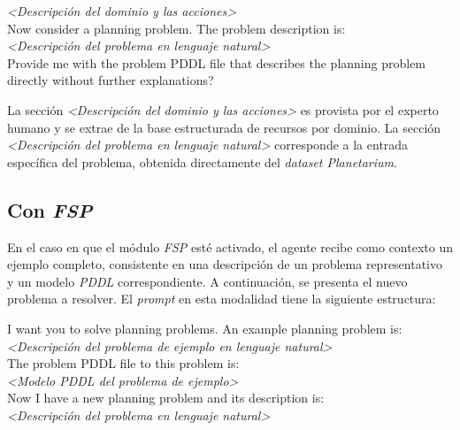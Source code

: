 \begin{anexes}
\begin{tcolorbox}[colback=gray!10!white, colframe=black, title=\textit{Prompt} del agente modelador sin \textit{FSP}, fonttitle=\bfseries, breakable]
\textit{<Descripción del dominio y las acciones>} \\

Now consider a planning problem. The problem description is: \\
\textit{<Descripción del problema en lenguaje natural>} \\

Provide me with the problem PDDL file that describes the planning problem directly without further explanations?
\end{tcolorbox}

La sección \textit{<Descripción del dominio y las acciones>} es provista por el experto humano y se extrae de la base estructurada de recursos por dominio. La sección \textit{<Descripción del problema en lenguaje natural>} corresponde a la entrada específica del problema, obtenida directamente del \textit{dataset Planetarium}.

\subsection*{Con \textit{FSP}}

En el caso en que el módulo \textit{FSP} esté activado, el agente recibe como contexto un ejemplo completo, consistente en una descripción de un problema representativo y un modelo \textit{PDDL} correspondiente. A continuación, se presenta el nuevo problema a resolver. El \textit{prompt} en esta modalidad tiene la siguiente estructura:

\begin{tcolorbox}[colback=gray!10!white, colframe=black, title=\textit{Prompt} del agente modelador con \textit{FSP}, fonttitle=\bfseries, breakable]
I want you to solve planning problems. An example planning problem is: \\
\textit{<Descripción del problema de ejemplo en lenguaje natural>} \\

The problem PDDL file to this problem is: \\
\textit{<Modelo PDDL del problema de ejemplo>} \\

Now I have a new planning problem and its description is: \\
\textit{<Descripción del problema en lenguaje natural>} \\


\end{tcolorbox}
\end{anexes}
